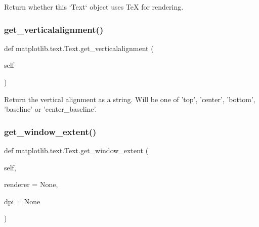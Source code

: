 \begin{DoxyVerb}Return whether this `Text` object uses TeX for rendering.\end{DoxyVerb}
 \mbox{\label{classmatplotlib_1_1text_1_1Text_a76b29d5a430010b6da900dbf41a3daca}} 
\subsubsection{\texorpdfstring{get\+\_\+verticalalignment()}{get\_verticalalignment()}}
{\footnotesize\ttfamily def matplotlib.\+text.\+Text.\+get\+\_\+verticalalignment (\begin{DoxyParamCaption}\item[{}]{self }\end{DoxyParamCaption})}

\begin{DoxyVerb}Return the vertical alignment as a string.  Will be one of
'top', 'center', 'bottom', 'baseline' or 'center_baseline'.
\end{DoxyVerb}
 \mbox{\label{classmatplotlib_1_1text_1_1Text_ac0e2a8f598e996278b526d9173a03d63}} 
\subsubsection{\texorpdfstring{get\+\_\+window\+\_\+extent()}{get\_window\_extent()}}
{\footnotesize\ttfamily def matplotlib.\+text.\+Text.\+get\+\_\+window\+\_\+extent (\begin{DoxyParamCaption}\item[{}]{self,  }\item[{}]{renderer = {\ttfamily None},  }\item[{}]{dpi = {\ttfamily None} }\end{DoxyParamCaption})}


